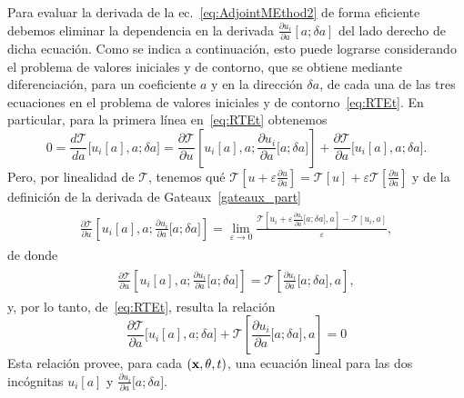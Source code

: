 Para evaluar la derivada de la ec.~\eqref{eq:AdjointMEthod2} de forma eficiente 
debemos eliminar la dependencia en la derivada $\frac{\partial u_i}{\partial a}[a;\delta a]$ 
del lado derecho de dicha ecuación. Como se indica a continuación, 
esto puede lograrse considerando el problema de valores iniciales 
y de contorno, que se obtiene mediante diferenciación, para un coeficiente 
$a$ y en la dirección $\delta a$, de cada una de las tres ecuaciones en 
el problema de valores iniciales y de contorno~\eqref{eq:RTEt}. 
En particular, para la primera línea en~\eqref{eq:RTEt} obtenemos
\begin{equation}
  0 = \frac{d\mathcal{T}}{da}\big[u_i[a],a;\delta a
  \big]=\frac{\partial \mathcal{T}}{\partial u}
  \left[u_i[a],a;\frac{\partial u_i}{\partial a}\big[a;\delta
    a\big]\right] + \frac{\partial \mathcal{T}}{\partial
    a}\big[u_i[a],a; \delta a \big].
\label{eq:RRTEder}
\end{equation}
Pero, por linealidad de $\mathcal{T}$, tenemos qué $\mathcal{T}[u+\varepsilon \frac{\partial u}{\partial a}]=\mathcal{T}[u]+\varepsilon\mathcal{T}[\frac{\partial u}{\partial a}]$ y 
de la definición de la derivada de Gateaux~\eqref{gateaux_part}
\begin{equation}
\begin{split}
\begin{aligned}
\frac{\partial \mathcal{T}}{\partial u}\left[u_i[a],a;\frac{\partial u_i}{\partial a}\big[a;\delta a\big]\right]= \lim_{\varepsilon \to 0} \frac{\mathcal{T}[u_i +\varepsilon\frac{\partial u_i}{\partial a}\big[a;\delta a\big],a]-\mathcal{T}[u_i,a]}{\varepsilon},
\end{aligned}
\end{split}
\label{eq:linealidadT}
\end{equation}
de donde
\begin{equation}
\begin{split}
\begin{aligned}
\frac{\partial \mathcal{T}}{\partial u}\left[u_i[a],a;\frac{\partial u_i}{\partial a}\big[a;\delta a\big]\right]=
\mathcal{T}\left[\frac{\partial u_i}{\partial a}\big[a;\delta a\big],a\right],
\end{aligned}
\end{split}
\label{eq:RRTEdet3}
\end{equation}
y, por lo tanto, de~\eqref{eq:RTEt}, resulta la relación
\begin{equation}
\frac{\partial \mathcal{T}}{\partial a}\big[u_i[a],a;\delta a\big] + 
\mathcal{T}\left[ \frac{\partial u_i}{\partial a}\big[a;\delta a\big],a \right]=0
\label{eq:RRTEdet4}
\end{equation}
Esta relación provee, para cada $(\mathbf{x},\theta,t)$, una ecuación 
lineal para las dos incógnitas $u_i[a]$ y 
$\frac{\partial u_i}{\partial a}\big[a;\delta a\big]$.


